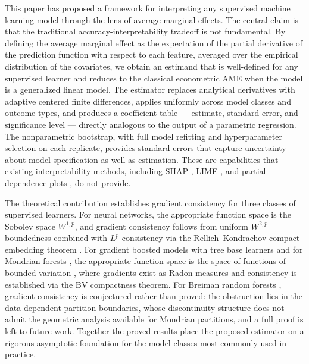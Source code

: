 \documentclass[12pt]{article}
\begin{document}
	This paper has proposed a framework for interpreting any supervised machine learning model through the lens of average marginal effects. The central claim is that the traditional accuracy-interpretability tradeoff is not fundamental. By defining the average marginal effect as the expectation of the partial derivative of the prediction function with respect to each feature, averaged over the empirical distribution of the covariates, we obtain an estimand that is well-defined for any supervised learner and reduces to the classical econometric AME when the model is a generalized linear model. The estimator replaces analytical derivatives with adaptive centered finite differences, applies uniformly across model classes and outcome types, and produces a coefficient table --- estimate, standard error, and significance level --- directly analogous to the output of a parametric regression. The nonparametric bootstrap, with full model refitting and hyperparameter selection on each replicate, provides standard errors that capture uncertainty about model specification as well as estimation. These are capabilities that existing interpretability methods, including SHAP \citep{lundberg2017shap}, LIME \citep{ribeiro2016lime}, and partial dependence plots \citep{friedman2001pdp}, do not provide.
	
	The theoretical contribution establishes gradient consistency for three classes of supervised learners. For neural networks, the appropriate function space is the Sobolev space $W^{1,p}$, and gradient consistency follows from uniform $W^{2,p}$ boundedness combined with $L^p$ consistency via the Rellich--Kondrachov compact embedding theorem \citep{evans2010pde}. For gradient boosted models with tree base learners and for Mondrian forests \citep{mourtada2017mondrian}, the appropriate function space is the space of functions of bounded variation \citep{ambrosio2000bv}, where gradients exist as Radon measures and consistency is established via the BV compactness theorem. For Breiman random forests \citep{breiman2001rf, scornet2015forests}, gradient consistency is conjectured rather than proved: the obstruction lies in the data-dependent partition boundaries, whose discontinuity structure does not admit the geometric analysis available for Mondrian partitions, and a full proof is left to future work. Together the proved results place the proposed estimator on a rigorous asymptotic foundation for the model classes most commonly used in practice.
	
\end{document}
